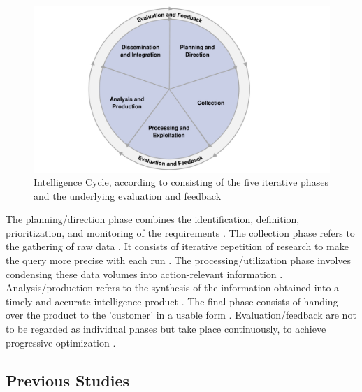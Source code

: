 \documentclass[10pt]{article}
\begin{document}
\begin{figure}[h]
    \centering
    \includegraphics[clip,width=0.6\linewidth]{PDF/images/crop_Intelligence Cycle}
    \caption{Intelligence Cycle, according to \cite{JointChiefsofStaffU.S.Army.2013} consisting of the five iterative phases and the underlying evaluation and feedback}
    \label{fig: Intelligence Cycle}
\end{figure}

The planning/direction phase combines the identification, definition, prioritization, and monitoring
of the requirements \cite{JointChiefsofStaffU.S.Army.2013}.
The collection phase refers to the gathering of raw data \cite{CentralIntelligenceAgency.1987}.
It consists of iterative repetition of research
\cite{NorthAtlanticTreatyOrganization.2001} to make the query more precise with each run
\cite{PastorGalindo.2020}. The processing/utilization phase involves condensing
these data volumes into action-relevant information
\cite{JointChiefsofStaffU.S.Army.2013}.
Analysis/production refers to the synthesis of the information obtained into a timely and accurate intelligence product
\cite{Hwang.2022, NorthAtlanticTreatyOrganization.2001}.
The final phase consists of handing over the product to the 'customer' in a
usable form \cite{CentralIntelligenceAgency.2023, Williams.2018}.
Evaluation/feedback are not to be regarded as individual phases
but take place continuously, to achieve progressive optimization
\cite{JointChiefsofStaffU.S.Army.2013, NorthAtlanticTreatyOrganization.2001}.

\subsection{Previous Studies}
\end{document}
